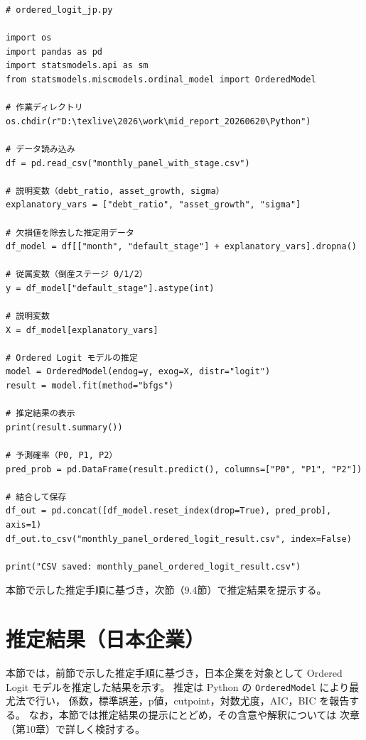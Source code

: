 \begin{verbatim}
# ordered_logit_jp.py

import os
import pandas as pd
import statsmodels.api as sm
from statsmodels.miscmodels.ordinal_model import OrderedModel

# 作業ディレクトリ
os.chdir(r"D:\texlive\2026\work\mid_report_20260620\Python")

# データ読み込み
df = pd.read_csv("monthly_panel_with_stage.csv")

# 説明変数（debt_ratio, asset_growth, sigma）
explanatory_vars = ["debt_ratio", "asset_growth", "sigma"]

# 欠損値を除去した推定用データ
df_model = df[["month", "default_stage"] + explanatory_vars].dropna()

# 従属変数（倒産ステージ 0/1/2）
y = df_model["default_stage"].astype(int)

# 説明変数
X = df_model[explanatory_vars]

# Ordered Logit モデルの推定
model = OrderedModel(endog=y, exog=X, distr="logit")
result = model.fit(method="bfgs")

# 推定結果の表示
print(result.summary())

# 予測確率（P0, P1, P2）
pred_prob = pd.DataFrame(result.predict(), columns=["P0", "P1", "P2"])

# 結合して保存
df_out = pd.concat([df_model.reset_index(drop=True), pred_prob], axis=1)
df_out.to_csv("monthly_panel_ordered_logit_result.csv", index=False)

print("CSV saved: monthly_panel_ordered_logit_result.csv")
\end{verbatim}

本節で示した推定手順に基づき，次節（9.4節）で推定結果を提示する。


\section{推定結果（日本企業）}

本節では，前節で示した推定手順に基づき，日本企業を対象として
Ordered Logit モデルを推定した結果を示す。
推定は Python の \texttt{OrderedModel} により最尤法で行い，
係数，標準誤差，p値，cutpoint，対数尤度，AIC，BIC を報告する。
なお，本節では推定結果の提示にとどめ，その含意や解釈については
次章（第10章）で詳しく検討する。



